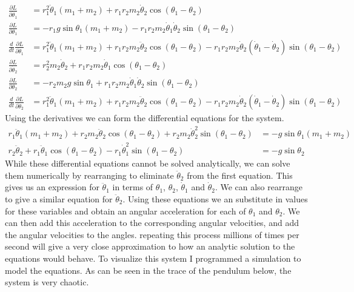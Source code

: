 \documentclass{article}
\begin{document}
\begin{align*}
    \frac{\partial L}{\partial \dot{\theta}_{1}} &= r_{1}^2 \dot{\theta}_{1} (m_{1} + m_{2})+ r_{1}r_{2}m_{2} \dot{\theta}_{2}\cos{(\theta_{1} - \theta_{2})} \\
    \frac{\partial L}{\partial \theta_{1}} &= - r_{1}g\sin{\theta_1}(m_{1} + m_{2}) - r_{1}r_{2}m_{2}\dot{\theta}_{1}\dot{\theta}_{2}\sin{(\theta_{1}-\theta_{2})} \\
    \frac{d}{dt} \frac{\partial L}{\partial \dot{\theta}_{1}} &= r_{1}^2 \ddot{\theta}_{1} (m_{1} + m_{2})+ r_{1}r_{2}m_{2} \ddot{\theta}_{2}\cos{(\theta_{1} - \theta_{2})} - r_{1}r_{2}m_{2} \dot{\theta}_{2}(\dot{\theta}_{1} - \dot{\theta}_{2})\sin{(\theta_{1} - \theta_{2})} \\
    \frac{\partial L}{\partial \dot{\theta}_{2}} &= r_{2}^2 m_{2}\dot{\theta}_{2}  + r_{1}r_{2}m_{2} \dot{\theta}_{1}\cos{(\theta_{1} - \theta_{2})} \\
    \frac{\partial L}{\partial \theta_{2}} &= - r_{2}m_{2}g\sin{\theta_1} +  r_{1}r_{2}m_{2}\dot{\theta}_{1}\dot{\theta}_{2}\sin{(\theta_{1}-\theta_{2})} \\
    \frac{d}{dt} \frac{\partial L}{\partial \dot{\theta}_{2}} &= r_{1}^2 \ddot{\theta}_{1} (m_{1} + m_{2})+ r_{1}r_{2}m_{2} \ddot{\theta}_{2}\cos{(\theta_{1} - \theta_{2})} - r_{1}r_{2}m_{2} \dot{\theta}_{2}(\dot{\theta}_{1} - \dot{\theta}_{2})\sin{(\theta_{1} - \theta_{2})}
\end{align*}
 Using the derivatives we can form the differential equations for the system.
\begin{align*}
r_{1}\ddot{\theta}_{1}(m_{1} + m_{2}) + r_{2}m_{2} \ddot{\theta}_{2}\cos{(\theta_{1} - \theta_{2})} + r_{2}m_{2}\dot{\theta}_{2}^2\sin{(\theta_{1} - \theta_{2})} &=
- g\sin{\theta_1}(m_{1} + m_{2}) \\
r_{2}\ddot{\theta}_{2} + r_{1} \ddot{\theta}_{1}\cos{(\theta_{1} - \theta_{2})} - r_{1}\dot{\theta}_{1}^2\sin{(\theta_{1} - \theta_{2})} &= - g\sin{\theta_2}
\end{align*}
While these differential equations cannot be solved analytically, we can solve them numerically by rearranging to eliminate \( \ddot{\theta}_{2} \) from the first equation. This gives us an expression for \(\ddot{\theta}_{1}\) in terms of \(\theta_{1}\), \(\theta_{2}\), \(\dot{\theta}_{1}\) and \(\dot{\theta}_{2}\). We can also rearrange to give a similar equation for \(\ddot{\theta}_{2}\). Using these equations we an substitute in values for these variables and obtain an angular acceleration for each of \(\theta_{1}\) and \(\theta_{2}\). We can then add this acceleration to the corresponding angular velocities, and add the angular velocities to the angles. repeating this process millions of times per second will give a very close approximation to how an analytic solution to the equations would behave. To visualize this system I programmed a simulation to model the equations. As can be seen in the trace of the pendulum below, the system is very chaotic.
\end{document}
